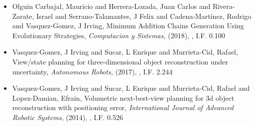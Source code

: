 \begin{itemize}
\item Olguin Carbajal, Mauricio and Herrera-Lozada, Juan Carlos and Rivera-Zarate, Israel and Serrano-Talamantes, J Felix and Cadena-Martínez, Rodrigo and Vasquez-Gomez, J Irving, Minimum Addition Chains Generation Using Evolutionary Strategies,\textit{ Computacion y Sistemas,} (2018), \href{https://doi.org/10.13053/CyS-22-4-2751} {\faFilePdfO}, I.F. 0.100 
\item Vasquez-Gomez, J Irving and Sucar, L Enrique and Murrieta-Cid, Rafael, View/state planning for three-dimensional object reconstruction under uncertainty,\textit{ Autonomous Robots,} (2017), \href{https://doi.org/10.1007/s10514-015-9531-3} {\faFilePdfO}, I.F. 2.244 
\item Vasquez-Gomez, J Irving and Sucar, L Enrique and Murrieta-Cid, Rafael and Lopez-Damian, Efrain, Volumetric next-best-view planning for 3d object reconstruction with positioning error,\textit{ International Journal of Advanced Robotic Systems,} (2014), \href{https://doi.org/10.5772/58759} {\faFilePdfO}, I.F. 0.526 
\end{itemize} 
